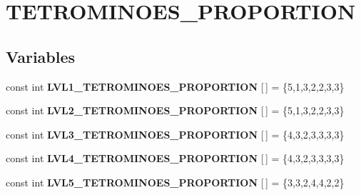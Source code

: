 \hypertarget{group__proportions__group}{}\section{T\+E\+T\+R\+O\+M\+I\+N\+O\+E\+S\+\_\+\+P\+R\+O\+P\+O\+R\+T\+I\+ON}
\label{group__proportions__group}
\subsection*{Variables}
\begin{DoxyCompactItemize}
\item 
\mbox{\label{group__proportions__group_gad2954f5bac8e868a0dcf43509b5b7045}} 
const int {\bfseries L\+V\+L1\+\_\+\+T\+E\+T\+R\+O\+M\+I\+N\+O\+E\+S\+\_\+\+P\+R\+O\+P\+O\+R\+T\+I\+ON} \mbox{[}$\,$\mbox{]} = \{5,1,3,2,2,3,3\}
\item 
\mbox{\label{group__proportions__group_ga3c3ecf90dffda0d26855c40ac328be20}} 
const int {\bfseries L\+V\+L2\+\_\+\+T\+E\+T\+R\+O\+M\+I\+N\+O\+E\+S\+\_\+\+P\+R\+O\+P\+O\+R\+T\+I\+ON} \mbox{[}$\,$\mbox{]} = \{5,1,3,2,2,3,3\}
\item 
\mbox{\label{group__proportions__group_gae540d0e1e6be7d4b85da39cae3c91e91}} 
const int {\bfseries L\+V\+L3\+\_\+\+T\+E\+T\+R\+O\+M\+I\+N\+O\+E\+S\+\_\+\+P\+R\+O\+P\+O\+R\+T\+I\+ON} \mbox{[}$\,$\mbox{]} = \{4,3,2,3,3,3,3\}
\item 
\mbox{\label{group__proportions__group_gad1178e2a9950cd9e35035878a4975e7f}} 
const int {\bfseries L\+V\+L4\+\_\+\+T\+E\+T\+R\+O\+M\+I\+N\+O\+E\+S\+\_\+\+P\+R\+O\+P\+O\+R\+T\+I\+ON} \mbox{[}$\,$\mbox{]} = \{4,3,2,3,3,3,3\}
\item 
\mbox{\label{group__proportions__group_gab4acc5185c14239db5315db0f3341e9b}} 
const int {\bfseries L\+V\+L5\+\_\+\+T\+E\+T\+R\+O\+M\+I\+N\+O\+E\+S\+\_\+\+P\+R\+O\+P\+O\+R\+T\+I\+ON} \mbox{[}$\,$\mbox{]} = \{3,3,2,4,4,2,2\}
\item 
\mbox{\label{group__proportions__group_ga1f803d5d00b5d63f956db64759379369}} 

\end{DoxyCompactItemize}

